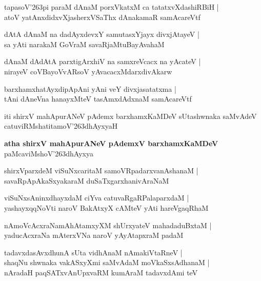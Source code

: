 \begin{shloka}
tapasoV\char'263pi paraM dAnaM porxVkatxM ca tatatxvXdashiRBiH |\\
atoV yatAnxdidxvXjasherxVSaThx dAnakamaR samAcareVtf
\end{shloka}

\begin{shloka}
dAtA dAnaM na dadAyxdevxY samutasxYjayx divxjAtayeV |\\
sa yAti narakaM GoVraM savaRjaMtuBayAvahaM 
\end{shloka}

\begin{shloka}
dAnaM dAdAtA parxtigArxhiV na samxreVcacx na yAcateV |\\
nirayeV coVBayoVvARsoV yAvacacxMdarxdivAkarw
\end{shloka}

\begin{shloka}
barxhamxhatAyxdipApAni yAni veY divxjasatatxma |\\
tAni dAneVna hanayxMteV tasAmxdAdxnaM samAcareVtf
\end{shloka}
iti shirxV mahApurANeV pAdemx barxhamxKaMDeV sUtashwnaka saMvAdeV catuviRMshatitamoV\char'263dhAyxyaH

\begin{center}
\textbf{\large atha shirxV mahApurANeV pAdemxV barxhamxKaMDeV}\\
paMcaviMshoV\char'263dhAyxya
\end{center}

\setcounter{shloka}{0}
\begin{shloka}
shirxVparxdeM viSuNxcaritaM samoVRpadarxvanAshanaM |\\
savaRpApAkaSxyakaraM duSaTxgarxhanivAraNaM 
\end{shloka}

\begin{shloka}
viSuNxsAninxdhayxdaM ciYva catuvaRgaRPalaparxdaM |\\
yashayxqqNoVti naroV BakAtxyX cAMteV yAti hareVgaqRhaM 
\end{shloka}

\begin{shloka}
nAmoVcAcxraNamAhAtamxyXM shUrxyateV mahadaduBxtaM |\\
yaducAcxraNa mAterxVNa naroV yAyAtapxraM padaM 
\end{shloka}

\begin{shloka}
tadavxdasAvxdhunA sUta vidhAnaM nAmakiVtaRneV |\\
shaqNu shwnaka vakASxyXmi saMvAdaM moVkaSxsAdhanaM |\\
nAradaH paqSATxvAnUpxvaRM kumAraM tadavxdAmi teV 
\end{shloka}

